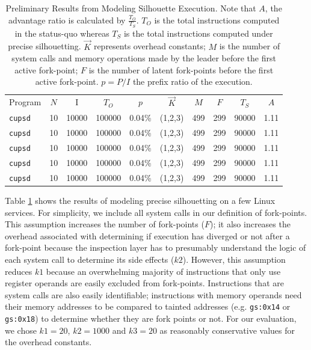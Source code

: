 \begin{table}[h]
  \caption{\hspace{0.2in}Preliminary Results from Modeling Silhouette Execution. \newline \newline 
  Note that $A$, the advantage ratio is calculated by $\frac{T_O}{T_S}$.
  $T_O$ is the total instructions computed in the status-quo whereas $T_S$ is the total instructions computed under
  precise silhouetting. $\vec K$ represents overhead constants; $M$ is the number
  of system calls and memory operations made by the leader before the first active fork-point; $F$
  is the number of latent fork-points before the first active fork-point. $p = P/I$
  the prefix ratio of the execution. }
\label{ps:inittbl}
\begin{center}
\begin{tabular}{|l||c|c||c||c|c|c|c||c||c|}\hline
  Program & $N$ & I & $T_O$ & $p$ & $\vec K$ & $M$ & $F$ & $T_S$ & $A$ \\
  \texttt{cupsd} & 10 & 10000 & 100000 & 0.04\% & (1,2,3) & 499 & 299 & 90000 & 1.11  \\\hline
  \texttt{cupsd} & 10 & 10000 & 100000 & 0.04\% & (1,2,3) & 499 & 299 & 90000 & 1.11  \\\hline
  \texttt{cupsd} & 10 & 10000 & 100000 & 0.04\% & (1,2,3) & 499 & 299 & 90000 & 1.11  \\\hline
  \texttt{cupsd} & 10 & 10000 & 100000 & 0.04\% & (1,2,3) & 499 & 299 & 90000 & 1.11  \\\hline
  \texttt{cupsd} & 10 & 10000 & 100000 & 0.04\% & (1,2,3) & 499 & 299 & 90000 & 1.11  \\\hline
\end{tabular}
\end{center}
\end{table}

 \newline
Table \ref{ps:inittbl} shows the results of modeling 
precise silhouetting on a few Linux services.
For simplicity, we include
all system calls in our definition
of fork-points.
This assumption increases the number of fork-points ($F$);
it also increases the overhead associated with determining 
if execution has diverged or not after a fork-point
because the inspection layer has to presumably
understand the logic of each system call
to determine its side effects ($k2$). However,
this assumption reduces $k1$ because an overwhelming majority
of instructions that only use register operands are easily
excluded from fork-points. Instructions
that are system calls are also easily identifiable;
instructions with memory operands need
their memory addresses to be 
compared to tainted addresses (e.g. \texttt{gs:0x14} or \texttt{gs:0x18})
to determine whether they are fork points or not.
For our evaluation, we chose $k1 = 20$,
$k2 = 1000$ and $k3 = 20$ as reasonably
conservative values for the overhead constants.

